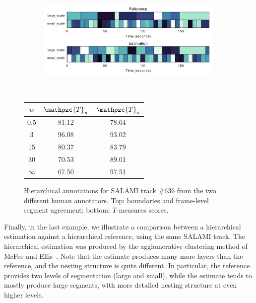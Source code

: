 \documentclass{article}
\def\shag{\ensuremath{\mathpzc{T}}}
\begin{document}
\begin{figure}[t]
  \centering
  \begin{subfigure}{0.5\textwidth}
    \centering
    \includegraphics[width=0.99\textwidth]{figs/SALAMI-SALAMI.pdf}
  \end{subfigure}%
  \\
  \begin{minipage}{0.5\textwidth}
    \centering
    \vspace{10pt}
    \begin{tabular}{|c|c|c|}
      \hline
      $w$       & $\shag_u$       & $\shag_o$      \\
      \hline
      0.5       & 81.12       & 78.64      \\     
      3         & 96.08       & 93.02      \\
      15        & 80.37       & 83.79    \\
      30        & 70.53       & 89.01    \\
      $\infty$  & 67.50       & 97.51    \\
      \hline
    \end{tabular}
  \end{minipage}
  \caption{Hierarchical annotations for SALAMI track \#636 from the two different human annotators. Top: boundaries and frame-level segment agreement; bottom: $T$-measures scores.}
  \label{fig:SALAMI-SALAMI}
\end{figure}

Finally, in the last example, we illustrate a comparison between a hierarchical estimation against a hierarchical reference, using the same SALAMI track.
The hierarchical estimation was produced by the agglomerative clustering method of McFee and Ellis~\cite{McFee2014}.
Note that the estimate produces many more layers than the reference, and the nesting structure is quite different.
In particular, the reference provides two levels of segmentation (large and small), while the estimate tends to mostly produce large segments, with more detailed nesting structure at even higher levels.
\end{document}
